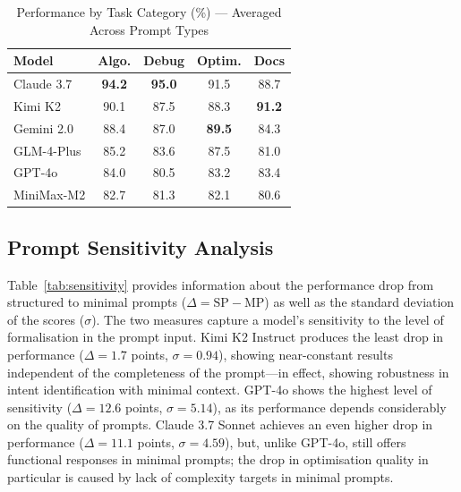 \documentclass[conference]{IEEEtran}
\begin{document}
\begin{table}[H]
\centering
\caption{Performance by Task Category (\%) — Averaged Across Prompt Types}
\label{tab:tasks}
\renewcommand{\arraystretch}{1.35}
\begin{tabular}{lcccc}
\toprule
\textbf{Model} & \textbf{Algo.} & \textbf{Debug} & \textbf{Optim.} & \textbf{Docs} \\
\midrule
Claude 3.7  & \textbf{94.2} & \textbf{95.0} & 91.5 & 88.7 \\
Kimi K2     & 90.1 & 87.5 & 88.3 & \textbf{91.2} \\
Gemini 2.0  & 88.4 & 87.0 & \textbf{89.5} & 84.3 \\
GLM-4-Plus  & 85.2 & 83.6 & 87.5 & 81.0 \\
GPT-4o      & 84.0 & 80.5 & 83.2 & 83.4 \\
MiniMax-M2  & 82.7 & 81.3 & 82.1 & 80.6 \\
\bottomrule
\end{tabular}
\end{table}

\subsection{Prompt Sensitivity Analysis}
\label{sec:results_sensitivity}

Table~\ref{tab:sensitivity} provides information about the performance drop from structured to minimal prompts ($\Delta = \text{SP} - \text{MP}$) as well as the standard deviation of the scores ($\sigma$). The two measures capture a model's sensitivity to the level of formalisation in the prompt input. Kimi K2 Instruct produces the least drop in performance ($\Delta = 1.7$ points, $\sigma = 0.94$), showing near-constant results independent of the completeness of the prompt—in effect, showing robustness in intent identification with minimal context. GPT-4o shows the highest level of sensitivity ($\Delta = 12.6$ points, $\sigma = 5.14$), as its performance depends considerably on the quality of prompts. Claude 3.7 Sonnet achieves an even higher drop in performance ($\Delta = 11.1$ points, $\sigma = 4.59$), but, unlike GPT-4o, still offers functional responses in minimal prompts; the drop in optimisation quality in particular is caused by lack of complexity targets in minimal prompts.
\end{document}

